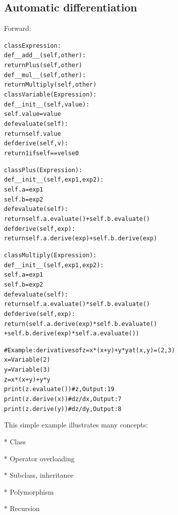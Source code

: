 \documentclass{article}
\newenvironment{tmcode}[1][]{\begin{alltt} }{\end{alltt}}
\begin{document}
\subsection{Automatic differentiation}

Forward:
\begin{tmcode}
class Expression:
    def __add__(self, other):
        return Plus(self, other)
    def __mul__(self, other):
        return Multiply(self,other)
class Variable(Expression):
    def __init__(self,value):
        self.value = value
    def evaluate(self):
        return self.value
    def derive(self, v):
        return 1 if self == v else 0

class Plus(Expression):
    def __init__(self,exp1,exp2):
        self.a = exp1
        self.b = exp2
    def evaluate(self):
        return self.a.evaluate() + self.b.evaluate()
    def derive(self,exp):
        return self.a.derive(exp) + self.b.derive(exp)

class Multiply(Expression):
    def __init__(self,exp1,exp2):
        self.a = exp1
        self.b = exp2
    def evaluate(self):
        return self.a.evaluate() * self.b.evaluate()
    def derive(self,exp):
        return (self.a.derive(exp)*self.b.evaluate() 
               +self.b.derive(exp)*self.a.evaluate())

# Example: derivatives of z = x * (x + y) + y * y at (x, y) = (2, 3)
x = Variable(2)
y = Variable(3)
z = x * (x + y) + y * y
print(z.evaluate()) # z, Output: 19
print(z.derive(x)) # dz/dx,  Output: 7
print(z.derive(y)) # dz/dy,  Output: 8
\end{tmcode}
This simple example illustrates many concepts:

* Class

* Operator overloading

* Subclass, inheritance

* Polymorphism

* Recursion

\
\end{document}
